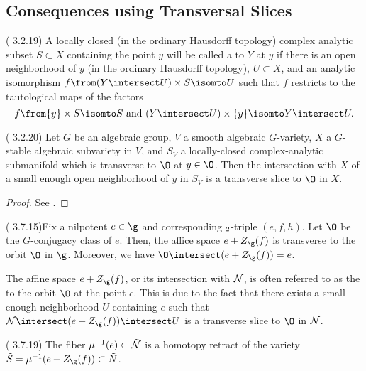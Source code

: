 \documentclass[springer-theory-notes.tex]{subfiles}
\begin{document}
\subsection{Consequences using Transversal Slices}
\begin{defn}
  (\cite{cg} 3.2.19) A locally closed (in the ordinary Hausdorff topology) complex
  analytic subset \(S \subset X\) containing the point \(y\) will be
  called a  to \(Y\) at \(y\) if there is an open
  neighborhood of \(y\) (in the ordinary Hausdorff topology), \(U
  \subset X\), and an analytic isomorphism \(f \from (Y \intersect U)
  \times S \isomto U\) such that \(f\) restricts to the tautological
  maps of the factors \[
    f \from \{y\} \times S \isomto S \text{ and } (Y \intersect U)
    \times \{y\} \isomto Y \intersect U.
  \]
\end{defn}
\begin{lem}
  (\cite{cg} 3.2.20) Let \(G\) be an algebraic group, \(V\) a smooth
  algebraic \(G\)-variety, \(X\) a \(G\)-stable algebraic
  subvariety in \(V\), and \(S_V\) a locally-closed complex-analytic
  submanifold which is transverse to \(\O\) at \(y \in \O\). Then the
  intersection with \(X\) of a small enough open neighborhood of \(y\)
  in \(S_V\) is a transverse slice to \(\O\) in \(X\). 
\end{lem}
\begin{proof}
  See \cite{cg}.
\end{proof}
\begin{prop}
  (\cite{cg} 3.7.15)Fix a nilpotent \(e \in \g\) and corresponding \(\sl_2\)-triple
  \((e,f,h)\). Let \(\O\) be the \(G\)-conjugacy class of \(e\). Then,
  the affice space \(e + Z_\g(f)\) is transverse to the orbit \(\O\)
  in \(\g\). Moreover, we have \(\O \intersect (e + Z_\g(f)) = e\).
\end{prop}
\begin{rmk}
  The affine space \(e + Z_\g(f)\), or its intersection with \(\mathcal{N}\),
  is often referred to as the  to the orbit \(\O\)
  at the point \(e\). This is due to the fact that there exists a
  small enough neighborhood \(U\) containing \(e\) such that \(\cN
  \intersect (e + Z_\g(f)) \intersect U\) is a transverse slice to
  \(\O\) in \(\mathcal{N}\).
\end{rmk}
\begin{cor}
  (\cite{cg} 3.7.19) The fiber \(\mu^{-1}(e) \subset \tilde{\mathcal{N}}\) is a homotopy retract
  of the variety \(\tilde{S} = \mu^{-1}(e + Z_\g(f)) \subset \tilde{N}\).
\end{cor}
\end{document}
